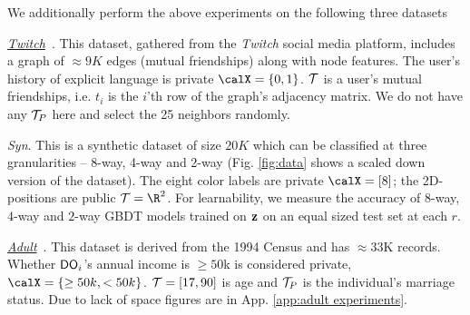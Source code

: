 
We additionally perform the above experiments on the following three datasets 
\squishlistfour \vspace{-0.25cm} 
\item \textit{\href{http://snap.stanford.edu/data/twitch-social-networks.html}{Twitch}}~\citep{twitch}. This dataset, gathered from the \emph{Twitch} social media platform, includes a graph of $\approx 9K$ edges (mutual friendships) along with node features. The user's history of explicit language is private $\calX = \{0,1\}$. $\mathcal{T}$ is a user's mutual friendships, i.e. $t_i$ is the $i$'th row of the graph's adjacency matrix. We do not have any $\mathcal{T}_P$ here and select the 25 neighbors randomly. 
\item \textit{Syn}. This is a synthetic dataset of size $20K$ which can be classified at three granularities -- 8-way, 4-way and 2-way  (Fig. \ref{fig:data} shows a scaled down version of the dataset). The eight color labels are private $\calX = [8]$; the 2D-positions are public $\calT = \R^2$. For learnability, we measure the accuracy of $8$-way, $4$-way and $2$-way GBDT models trained on $\mathbf{z}$ on an equal sized test set at each $r$.
\item \textit{\href{https://archive.ics.uci.edu/ml/datasets/Adult}{Adult}}~\citep{adult}. This dataset is derived from the 1994 Census and has $\approx33$K records.  Whether $\textsf{DO}_i$'s annual income is $\geq 50$k is considered private, $\calX = \{\geq 50k, <50k\}$. $\mathcal{T} = [17, 90]$ is age and $\mathcal{T}_P$ is the  individual's marriage status. Due to lack of space figures are in App. \ref{app:adult experiments}. %
\vspace{-0.05cm}
\vspace{-0.1cm}
\squishendfour 

